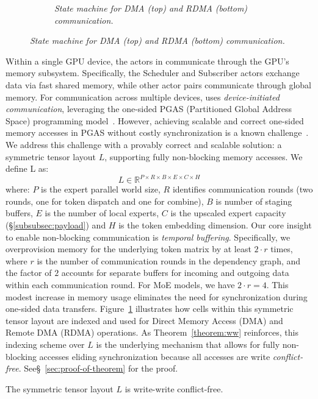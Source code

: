 \begin{figure}[!ht]
\begin{subfigure}{0.25\textwidth}
        \caption{\emph{State machine for DMA (top) and RDMA (bottom) communication.}}
        \label{fig:sm}
    \end{subfigure}\label{fig:symmt}
\end{figure}

Within a single GPU device, the actors in \sysname communicate through the GPU's memory subsystem.
Specifically, the Scheduler and Subscriber actors exchange data via fast shared memory, while other actor pairs
communicate through global memory.
For communication across multiple devices, \sysname uses \emph{device-initiated communication},
leveraging the one-sided PGAS (Partitioned Global Address Space) programming model~\cite{10.1145/1278177.1278183}.
However, achieving scalable and correct one-sided memory accesses in PGAS without costly synchronization
is a known challenge~\cite{deepep, triton-dist}.
We address this challenge with a provably correct and scalable solution: a symmetric tensor layout $L$,
supporting fully non-blocking memory accesses.
We define L as:\\
\[
    L \in \mathbb{R}^{P\times R \times B \times E \times C \times H}
\]
where: $P$ is the expert parallel world size, $R$ identifies communication rounds (\ie two rounds,
one for token dispatch and one for combine), $B$ is number of staging buffers,
$E$ is the number of local experts, $C$ is the upscaled expert capacity (\S\ref{subsubsec:payload})
and $H$ is the token embedding dimension.
Our core insight to enable non-blocking communication is \emph{temporal buffering}.
Specifically, we overprovision memory for the underlying token matrix by at least $2 \cdot r$ times, where $r$
is the number of communication rounds in the dependency graph, and the factor of $2$ accounts for
separate buffers for incoming and outgoing data within each communication round.
For MoE models, we have $2 \cdot r = 4$.
This modest increase in memory usage eliminates the need for synchronization during one-sided data transfers.
Figure~\ref{fig:sm} illustrates how cells within this symmetric tensor layout are indexed
and used for Direct Memory Access (DMA) and Remote DMA (RDMA) operations.
As Theorem~\ref{theorem:ww} reinforces,
this indexing scheme over $L$ is the underlying mechanism that allows for fully non-blocking accesses eliding
synchronization because all accesses are write \emph{conflict-free}.
See\S~\ref{sec:proof-of-theorem} for the proof.
\begin{theorem}\label{theorem:ww}
   The symmetric tensor layout $L$ is write-write conflict-free.
\end{theorem}
